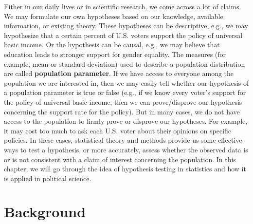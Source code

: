 \documentclass{book}
\begin{document}
Either in our daily lives or in scientific research, we come across a lot of
claims. We may formulate our own hypotheses based on our knowledge, available
information, or existing theory. These hypotheses can be descriptive, e.g., we
may hypothesize that a certain percent of U.S. voters support the policy of
universal basic income. Or the hypothesis can be causal, e.g., we may believe
that education leads to stronger support for gender equality. The measures
(for example, mean or standard deviation) used to describe a population
distribution are called \textbf{population parameter}. If we have access to
everyone among the population we are interested in, then we may easily tell
whether our hypothesis of a population parameter is true or false (e.g., if we
know every voter's support for the policy of universal basic income, then we
can prove/disprove our hypothesis concerning the support rate for the policy).
But in many cases, we do not have access to the population to firmly prove or
disprove our hypotheses. For example, it may cost too much to ask each U.S.
voter about their opinions on specific policies. In these cases, statistical
theory and methods provide us some effective ways to test a hypothesis, or
more accurately, assess whether the observed data is or is not consistent with
a claim of interest concerning the population. In this chapter, we will go
through the idea of hypothesis testing in statistics and how it is applied in
political science.

\hypertarget{background}{%
\section{Background}\label{background}}
\end{document}
